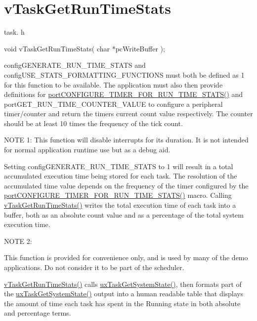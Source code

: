 \hypertarget{group__v_task_get_run_time_stats}{}\section{v\+Task\+Get\+Run\+Time\+Stats}
\label{group__v_task_get_run_time_stats}
task. h 
\begin{DoxyPre}void vTaskGetRunTimeStats( char *pcWriteBuffer );\end{DoxyPre}


config\+G\+E\+N\+E\+R\+A\+T\+E\+\_\+\+R\+U\+N\+\_\+\+T\+I\+M\+E\+\_\+\+S\+T\+A\+TS and config\+U\+S\+E\+\_\+\+S\+T\+A\+T\+S\+\_\+\+F\+O\+R\+M\+A\+T\+T\+I\+N\+G\+\_\+\+F\+U\+N\+C\+T\+I\+O\+NS must both be defined as 1 for this function to be available. The application must also then provide definitions for \mbox{\hyperlink{_free_r_t_o_s_8h_a727939bcdb98501e0eba0ec8a1841e1b}{port\+C\+O\+N\+F\+I\+G\+U\+R\+E\+\_\+\+T\+I\+M\+E\+R\+\_\+\+F\+O\+R\+\_\+\+R\+U\+N\+\_\+\+T\+I\+M\+E\+\_\+\+S\+T\+A\+T\+S()}} and port\+G\+E\+T\+\_\+\+R\+U\+N\+\_\+\+T\+I\+M\+E\+\_\+\+C\+O\+U\+N\+T\+E\+R\+\_\+\+V\+A\+L\+UE to configure a peripheral timer/counter and return the timers current count value respectively. The counter should be at least 10 times the frequency of the tick count.

N\+O\+TE 1\+: This function will disable interrupts for its duration. It is not intended for normal application runtime use but as a debug aid.

Setting config\+G\+E\+N\+E\+R\+A\+T\+E\+\_\+\+R\+U\+N\+\_\+\+T\+I\+M\+E\+\_\+\+S\+T\+A\+TS to 1 will result in a total accumulated execution time being stored for each task. The resolution of the accumulated time value depends on the frequency of the timer configured by the \mbox{\hyperlink{_free_r_t_o_s_8h_a727939bcdb98501e0eba0ec8a1841e1b}{port\+C\+O\+N\+F\+I\+G\+U\+R\+E\+\_\+\+T\+I\+M\+E\+R\+\_\+\+F\+O\+R\+\_\+\+R\+U\+N\+\_\+\+T\+I\+M\+E\+\_\+\+S\+T\+A\+T\+S()}} macro. Calling \mbox{\hyperlink{task_8h_ac34910d5eac69f0538ee218e527663a7}{v\+Task\+Get\+Run\+Time\+Stats()}} writes the total execution time of each task into a buffer, both as an absolute count value and as a percentage of the total system execution time.

N\+O\+TE 2\+:

This function is provided for convenience only, and is used by many of the demo applications. Do not consider it to be part of the scheduler.

\mbox{\hyperlink{task_8h_ac34910d5eac69f0538ee218e527663a7}{v\+Task\+Get\+Run\+Time\+Stats()}} calls \mbox{\hyperlink{task_8h_ade68760111c37287a3b82c41dff8ec7d}{ux\+Task\+Get\+System\+State()}}, then formats part of the \mbox{\hyperlink{task_8h_ade68760111c37287a3b82c41dff8ec7d}{ux\+Task\+Get\+System\+State()}} output into a human readable table that displays the amount of time each task has spent in the Running state in both absolute and percentage terms.

